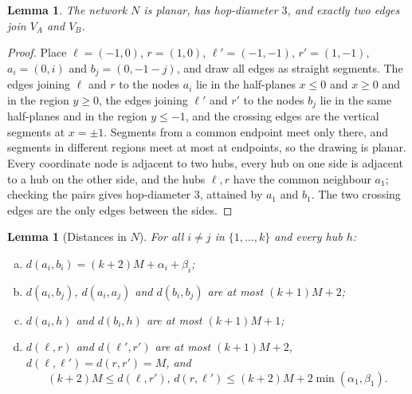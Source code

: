 \documentclass[11pt]{article}
\newtheorem{lemma}[theorem]{Lemma}
\theoremstyle{definition}
\theoremstyle{remark}
\begin{document}
\begin{lemma}\label{lem:structure}
The network $N$ is planar, has hop-diameter $3$, and exactly two edges join $V_A$ and $V_B$.
\end{lemma}

\begin{proof}
Place $\ell=(-1,0)$, $r=(1,0)$, $\ell'=(-1,-1)$, $r'=(1,-1)$, $a_i=(0,i)$ and $b_j=(0,-1-j)$, and draw all edges as straight segments. The edges joining $\ell$ and $r$ to the nodes $a_i$ lie in the half-planes $x\le 0$ and $x\ge 0$ and in the region $y\ge 0$, the edges joining $\ell'$ and $r'$ to the nodes $b_j$ lie in the same half-planes and in the region $y\le -1$, and the crossing edges are the vertical segments at $x=\pm1$. Segments from a common endpoint meet only there, and segments in different regions meet at most at endpoints, so the drawing is planar. Every coordinate node is adjacent to two hubs, every hub on one side is adjacent to a hub on the other side, and the hubs $\ell, r$ have the common neighbour $a_1$; checking the pairs gives hop-diameter $3$, attained by $a_1$ and $b_1$. The two crossing edges are the only edges between the sides.
\end{proof}

\begin{lemma}[Distances in $N$]\label{lem:dist}
For all $i\ne j$ in $\{1,\dots,k\}$ and every hub $h$:
\begin{enumerate}[(a)]
\item $d(a_i,b_i)=(k+2)M+\alpha_i+\beta_i$;
\item $d(a_i,b_j)$, $d(a_i,a_j)$ and $d(b_i,b_j)$ are at most $(k+1)M+2$;
\item $d(a_i,h)$ and $d(b_i,h)$ are at most $(k+1)M+1$;
\item $d(\ell,r)$ and $d(\ell',r')$ are at most $(k+1)M+2$, $d(\ell,\ell')=d(r,r')=M$, and
\[
(k+2)M\le d(\ell,r'),\,d(r,\ell')\le (k+2)M+2\min(\alpha_1,\beta_1).
\]
\end{enumerate}
\end{lemma}
\end{document}
